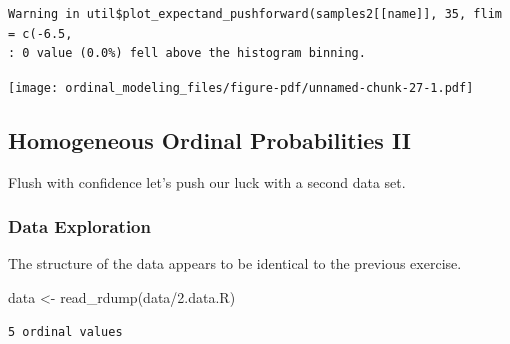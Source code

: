 \documentclass[
  letterpaper,
  DIV=11,
  numbers=noendperiod]{scrartcl}
\newenvironment{Shaded}{\begin{snugshade}}{\end{snugshade}}
\newcommand{\FunctionTok}[1]{\textcolor[rgb]{0.28,0.35,0.67}{#1}}
\newcommand{\NormalTok}[1]{\textcolor[rgb]{0.00,0.23,0.31}{#1}}
\newcommand{\OtherTok}[1]{\textcolor[rgb]{0.00,0.23,0.31}{#1}}
\newcommand{\SpecialCharTok}[1]{\textcolor[rgb]{0.37,0.37,0.37}{#1}}
\newcommand{\StringTok}[1]{\textcolor[rgb]{0.13,0.47,0.30}{#1}}
\begin{document}
\begin{verbatim}
Warning in util$plot_expectand_pushforward(samples2[[name]], 35, flim = c(-6.5,
: 0 value (0.0%) fell above the histogram binning.
\end{verbatim}

\texttt{[image: ordinal\_modeling\_files/figure-pdf/unnamed-chunk-27-1.pdf]}

\subsection{Homogeneous Ordinal Probabilities
II}\label{homogeneous-ordinal-probabilities-ii}

Flush with confidence let's push our luck with a second data set.

\subsubsection{Data Exploration}\label{data-exploration-1}

The structure of the data appears to be identical to the previous
exercise.

\begin{Shaded}
\begin{Highlighting}[]
\NormalTok{data }\OtherTok{\textless{}{-}} \FunctionTok{read\_rdump}\NormalTok{(}\StringTok{\textquotesingle{}data/2.data.R\textquotesingle{}}\NormalTok{)}
\end{Highlighting}
\end{Shaded}

\begin{Shaded}
\end{Shaded}

\begin{verbatim}
5 ordinal values
\end{verbatim}

\begin{Shaded}
\end{Shaded}
\end{document}
